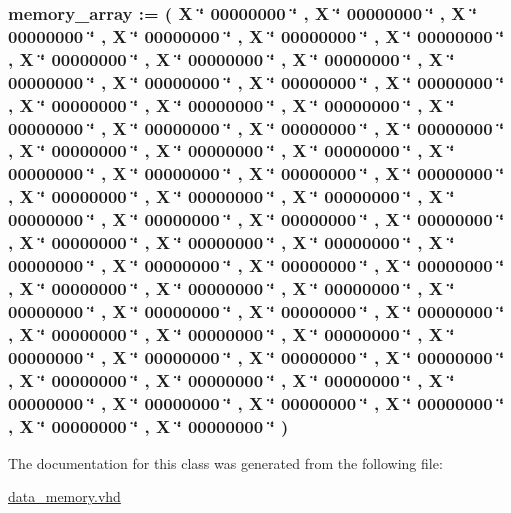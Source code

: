\hypertarget{classdata__memory_1_1behavioral_a2600aba194e7d93337116c95534d00ac}{
\subsubsection[{data\-Mem}]{ {\bfseries {\bfseries {\bf memory\-\_\-array}}   \-:=  (  \-X \char`\"{} 00000000 \char`\"{} ,  \-X \char`\"{} 00000000 \char`\"{} ,  \-X \char`\"{} 00000000 \char`\"{} ,  \-X \char`\"{} 00000000 \char`\"{} ,  \-X \char`\"{} 00000000 \char`\"{} ,  \-X \char`\"{} 00000000 \char`\"{} ,  \-X \char`\"{} 00000000 \char`\"{} ,  \-X \char`\"{} 00000000 \char`\"{} ,  \-X \char`\"{} 00000000 \char`\"{} ,  \-X \char`\"{} 00000000 \char`\"{} ,  \-X \char`\"{} 00000000 \char`\"{} ,  \-X \char`\"{} 00000000 \char`\"{} ,  \-X \char`\"{} 00000000 \char`\"{} ,  \-X \char`\"{} 00000000 \char`\"{} ,  \-X \char`\"{} 00000000 \char`\"{} ,  \-X \char`\"{} 00000000 \char`\"{} ,  \-X \char`\"{} 00000000 \char`\"{} ,  \-X \char`\"{} 00000000 \char`\"{} ,  \-X \char`\"{} 00000000 \char`\"{} ,  \-X \char`\"{} 00000000 \char`\"{} ,  \-X \char`\"{} 00000000 \char`\"{} ,  \-X \char`\"{} 00000000 \char`\"{} ,  \-X \char`\"{} 00000000 \char`\"{} ,  \-X \char`\"{} 00000000 \char`\"{} ,  \-X \char`\"{} 00000000 \char`\"{} ,  \-X \char`\"{} 00000000 \char`\"{} ,  \-X \char`\"{} 00000000 \char`\"{} ,  \-X \char`\"{} 00000000 \char`\"{} ,  \-X \char`\"{} 00000000 \char`\"{} ,  \-X \char`\"{} 00000000 \char`\"{} ,  \-X \char`\"{} 00000000 \char`\"{} ,  \-X \char`\"{} 00000000 \char`\"{} ,  \-X \char`\"{} 00000000 \char`\"{} ,  \-X \char`\"{} 00000000 \char`\"{} ,  \-X \char`\"{} 00000000 \char`\"{} ,  \-X \char`\"{} 00000000 \char`\"{} ,  \-X \char`\"{} 00000000 \char`\"{} ,  \-X \char`\"{} 00000000 \char`\"{} ,  \-X \char`\"{} 00000000 \char`\"{} ,  \-X \char`\"{} 00000000 \char`\"{} ,  \-X \char`\"{} 00000000 \char`\"{} ,  \-X \char`\"{} 00000000 \char`\"{} ,  \-X \char`\"{} 00000000 \char`\"{} ,  \-X \char`\"{} 00000000 \char`\"{} ,  \-X \char`\"{} 00000000 \char`\"{} ,  \-X \char`\"{} 00000000 \char`\"{} ,  \-X \char`\"{} 00000000 \char`\"{} ,  \-X \char`\"{} 00000000 \char`\"{} ,  \-X \char`\"{} 00000000 \char`\"{} ,  \-X \char`\"{} 00000000 \char`\"{} ,  \-X \char`\"{} 00000000 \char`\"{} ,  \-X \char`\"{} 00000000 \char`\"{} ,  \-X \char`\"{} 00000000 \char`\"{} ,  \-X \char`\"{} 00000000 \char`\"{} ,  \-X \char`\"{} 00000000 \char`\"{} ,  \-X \char`\"{} 00000000 \char`\"{} ,  \-X \char`\"{} 00000000 \char`\"{} ,  \-X \char`\"{} 00000000 \char`\"{} ,  \-X \char`\"{} 00000000 \char`\"{} ,  \-X \char`\"{} 00000000 \char`\"{} ,  \-X \char`\"{} 00000000 \char`\"{} ,  \-X \char`\"{} 00000000 \char`\"{} ,  \-X \char`\"{} 00000000 \char`\"{} ,  \-X \char`\"{} 00000000 \char`\"{}  ) } }}\label{classdata__memory_1_1behavioral_a2600aba194e7d93337116c95534d00ac}


\-The documentation for this class was generated from the following file\-:\begin{DoxyCompactItemize}
\item 
\hyperlink{data__memory_8vhd}{data\-\_\-memory.\-vhd}\end{DoxyCompactItemize}
